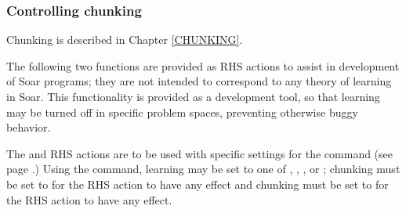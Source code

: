 \subsubsection{Controlling chunking}
\label{SYNTAX-pm-rhs-learning}



Chunking is described in Chapter \ref{CHUNKING}.

The following two functions are provided as RHS actions to assist in development of Soar programs; they are not intended to correspond to any theory of learning in Soar. This functionality is provided as a development tool, so that learning may be turned off in specific problem spaces, preventing otherwise buggy behavior.

The  and  RHS actions are to be used with specific settings for the  command (see page \pageref{chunk}.) Using the  command, learning may be set to one of , , , or ; chunking must be set to  for the  RHS action to have any effect and chunking must be set to  for the  RHS action to have any effect.

